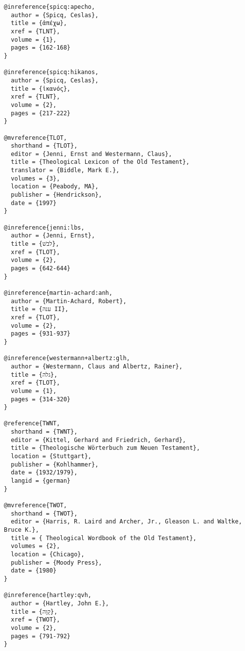 \documentclass[a4paper]{article}
\begin{document}
\begin{verbatim}
@inreference{spicq:apecho,
  author = {Spicq, Ceslas},
  title = {ἀπέχω},
  xref = {TLNT},
  volume = {1},
  pages = {162-168}
}

@inreference{spicq:hikanos,
  author = {Spicq, Ceslas},
  title = {ἱκανός},
  xref = {TLNT},
  volume = {2},
  pages = {217-222}
}

@mvreference{TLOT,
  shorthand = {TLOT},
  editor = {Jenni, Ernst and Westermann, Claus},
  title = {Theological Lexicon of the Old Testament},
  translator = {Biddle, Mark E.},
  volumes = {3},
  location = {Peabody, MA},
  publisher = {Hendrickson},
  date = {1997}
}

@inreference{jenni:lbs,
  author = {Jenni, Ernst},
  title = {לבשׁ},
  xref = {TLOT},
  volume = {2},
  pages = {642-644}
}

@inreference{martin-achard:anh,
  author = {Martin-Achard, Robert},
  title = {ענה II},
  xref = {TLOT},
  volume = {2},
  pages = {931-937}
}

@inreference{westermann+albertz:glh,
  author = {Westermann, Claus and Albertz, Rainer},
  title = {גלה},
  xref = {TLOT},
  volume = {1},
  pages = {314-320}
}

@reference{TWNT,
  shorthand = {TWNT},
  editor = {Kittel, Gerhard and Friedrich, Gerhard},
  title = {Theologische Wörterbuch zum Neuen Testament},
  location = {Stuttgart},
  publisher = {Kohlhammer},
  date = {1932/1979},
  langid = {german}
}

@mvreference{TWOT,
  shorthand = {TWOT},
  editor = {Harris, R. Laird and Archer, Jr., Gleason L. and Waltke, Bruce K.},
  title = { Theological Wordbook of the Old Testament},
  volumes = {2},
  location = {Chicago},
  publisher = {Moody Press},
  date = {1980}
}

@inreference{hartley:qvh,
  author = {Hartley, John E.},
  title = {קָוָה},
  xref = {TWOT},
  volume = {2},
  pages = {791-792}
}
\end{verbatim}
\end{document}
